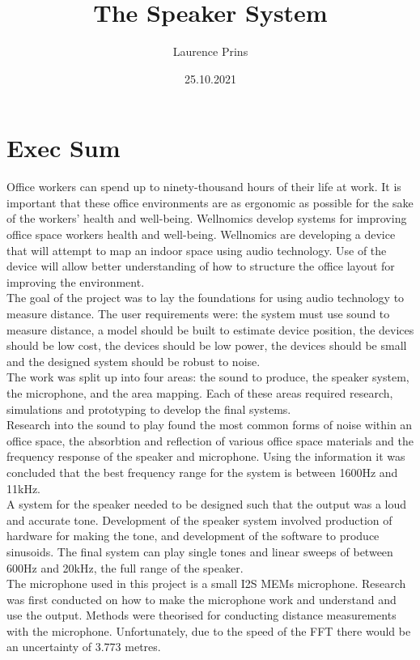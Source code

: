 \documentclass[12pt, a4paper]{article}
\title{The Speaker System}
\author{Laurence Prins}
\date{25.10.2021}
\begin{document}
\section{Exec Sum}
Office workers can spend up to ninety-thousand hours of their life at work. It is important that these office environments are as ergonomic as possible for the sake of the workers’ health and well-being. Wellnomics develop systems for improving office space workers health and well-being. Wellnomics are developing a device that will attempt to map an indoor space using audio technology. Use of the device will allow better understanding of how to structure the office layout for improving the environment. \\

The goal of the project was to lay the foundations for using audio technology to measure distance. The user requirements were: the system must use sound to measure distance, a model should be built to estimate device position, the devices should be low cost, the devices should be low power, the devices should be small and the designed system should be robust to noise. \\

The work was split up into four areas: the sound to produce, the speaker system, the microphone, and the area mapping. Each of these areas required research, simulations and prototyping to develop the final systems. \\

Research into the sound to play found the most common forms of noise within an office space, the absorbtion and reflection of various office space materials and the frequency response of the speaker and microphone. Using the information it was concluded that the best frequency range for the system is between 1600Hz and 11kHz. \\

A system for the speaker needed to be designed such that the output was a loud and accurate tone. Development of the speaker system involved production of hardware for making the tone, and development of the software to produce sinusoids. The final system can play single tones and linear sweeps of between 600Hz and 20kHz, the full range of the speaker. \\

The microphone used in this project is a small I2S MEMs microphone. Research was first conducted on how to make the microphone work and understand and use the output. Methods were theorised for conducting distance measurements with the microphone. Unfortunately, due to the speed of the FFT there would be an uncertainty of 3.773 metres. \\
\end{document}

